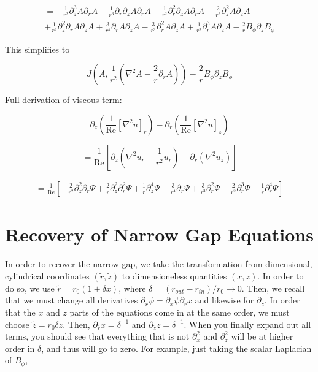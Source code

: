 \documentclass{paper}
\newcommand{\beq}{\begin{equation}}
\newcommand{\eeq}{\end{equation}}
\newcommand\reye{\mathrm{Re}}
\begin{document}
\begin{multline}
= -\frac{1}{r^2} \partial_z^3 A \partial_r A + \frac{1}{r^3} \partial_r \partial_z A \partial_r A - \frac{1}{r^2} \partial_r^2 \partial_z A \partial_r A - \frac{2}{r^3} \partial_z^2 A \partial_z A \\
+ \frac{1}{r^2} \partial_z^2 \partial_r A \partial_z A + \frac{3}{r^4} \partial_r A \partial_z A - \frac{3}{r^3} \partial_r^2 A \partial_z A + \frac{1}{r^2} \partial_r^3 A \partial_z A - \frac{2}{r} B_\phi \partial_z B_\phi
\end{multline}

This simplifies to 

\beq
J\left(A, \frac{1}{r^2} \left( \nabla^2 A - \frac{2}{r} \partial_rA\right) \right) - \frac{2}{r}B_\phi \partial_z B_\phi
\eeq

Full derivation of viscous term:

\beq
\partial_z \left(\frac{1}{\reye}\left[\nabla^2 u\right]_r\right) - \partial_r \left(\frac{1}{\reye}\left[\nabla^2 u\right]_z\right)
\eeq

\beq
= \frac{1}{\reye}\left[\partial_z \left(\nabla^2 u_r - \frac{1}{r^2} u_r\right) - \partial_r \left(\nabla^2 u_z\right)\right]
\eeq

\begin{multline}
= \frac{1}{\reye} \left[ - \frac{2}{r^2} \partial_z^2 \partial_r \Psi + \frac{2}{r} \partial_z^2 \partial_r^2 \Psi + \frac{1}{r} \partial_z^4 \Psi - \frac{3}{r^4} \partial_r \Psi + \frac{3}{r^3} \partial_r^2 \Psi - \frac{2}{r^2} \partial_r^3 \Psi + \frac{1}{r} \partial_r^4 \Psi \right]
\end{multline}


\section{Recovery of Narrow Gap Equations}
\label{sec:narrow_gap_recovery}

In order to recover the narrow gap, we take the transformation from dimensional, cylindrical coordinates $(\widetilde{r},\widetilde{z})$ to dimensioneless quantities $(x,z)$. In order to do so, we use $\widetilde{r} = r_0 (1 + \delta x)$, where $\delta = (r_{out} - r_{in})/r_0 \to 0$. Then, we recall that we must change all derivatives $\partial_{\widetilde{r}} \psi = \partial_x \psi \partial_{\widetilde{r}} x$ and likewise for $\partial_{\widetilde{z}}$. In order that the $x$ and $z$ parts of the equations come in at the same order, we must choose $\widetilde{z} = r_0 \delta z$. Then, $\partial_{\widetilde{r}} x = \delta^{-1}$ and $\partial_{\widetilde{z}} z = \delta^{-1}$. When you finally expand out all terms, you should see that everything that is not $\partial^2_x$ and $\partial^2_z$ will be at higher order in $\delta$, and thus will go to zero. For example, just taking the scalar Laplacian of $B_\phi$, 
\end{document}
